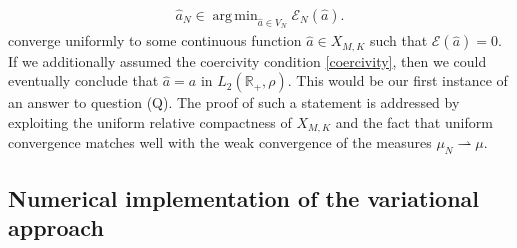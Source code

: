 \documentclass[A4paper,11pt]{article}
\theoremstyle{definition}
\DeclareMathOperator{\supp}{supp}
\DeclareMathOperator{\argmin}{arg\,min}
\begin{document}
	\begin{align} \label{truealgo1}
		\widehat a_N\in\argmin_{\widehat a\in V_N} \mathcal E_N(\widehat a).
	\end{align}
 converge uniformly to some continuous function $\widehat a \in X_{M,K}$ such that
	$\mathcal E(\widehat a)=0$. If we additionally assumed the coercivity condition \eqref{coercivity}, then we could eventually conclude that 
	$\widehat a=a$ in $L_2(\mathbb R_+, \rho)$. This would be our first instance of an answer to question (Q). The proof of such a statement is  addressed by exploiting the uniform relative compactness of $X_{M,K}$
and the fact that uniform convergence matches well with the weak convergence of the measures $\mu_N \rightharpoonup \mu$.


\subsection{Numerical implementation of the variational approach }\label{sec:wp3}
\end{document}
